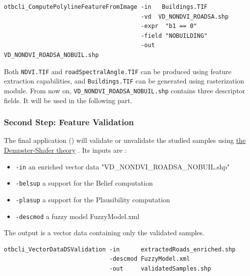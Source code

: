 \begin{verbatim}
otbcli_ComputePolylineFeatureFromImage -in   Buildings.TIF 
                                       -vd  VD_NONDVI_ROADSA.shp 
                                       -expr  "b1 == 0" 
                                       -field "NOBUILDING" 
                                       -out   VD_NONDVI_ROADSA_NOBUIL.shp
\end{verbatim}

Both \verb?NDVI.TIF? and \verb?roadSpectralAngle.TIF? can be produced 
using \mont feature extraction capabilities, and \verb?Buildings.TIF? 
can be generated using \mont rasterization module. From now on, 
\verb?VD_NONDVI_ROADSA_NOBUIL.shp? contains three descriptor fields. 
It will be used in the following part.

\subsubsection{Second Step: Feature Validation}

The final application () will 
validate or unvalidate the studied samples using 
\href{http://en.wikipedia.org/wiki/Dempster\%E2\%80\%93Shafer_theory}{the Dempster-Shafer theory}
. Its inputs are :
\begin{itemize}
\item \verb?-in? an enriched vector data "VD\_NONDVI\_ROADSA\_NOBUIL.shp"
\item \verb?-belsup? a support for the Belief computation
\item \verb?-plasup? a support for the Plausibility computation
\item \verb?-descmod? a fuzzy model FuzzyModel.xml
\end{itemize}
The output is a vector data containing only the validated samples.

\begin{verbatim}
otbcli_VectorDataDSValidation -in      extractedRoads_enriched.shp 
                              -descmod FuzzyModel.xml 
                              -out     validatedSamples.shp
\end{verbatim}
